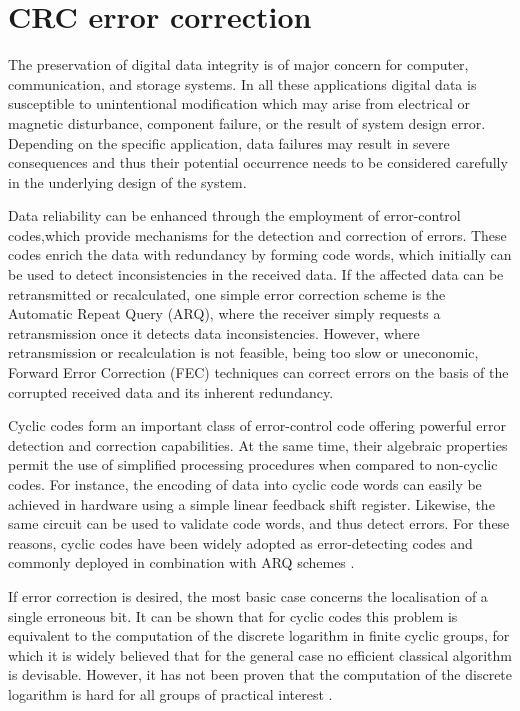 \documentclass[oneside, a4paper, 11pt]{memoir}
\begin{document}
\chapter{CRC error correction}
\label{sec:crc}

The preservation of digital data integrity is of major concern for computer, communication, and storage systems. In all these applications digital data is susceptible to unintentional modification which may arise from electrical or magnetic disturbance, component failure, or the result of system design error. Depending on the specific application, data failures may result in severe consequences and thus their potential occurrence needs to be considered carefully in the underlying design of the system.

Data reliability can be enhanced through the employment of error-control codes,which provide mechanisms for the detection and correction of errors. These codes enrich the data with redundancy by forming code words, which initially can be used to detect inconsistencies in the received data. If the affected data can be retransmitted or recalculated, one simple error correction scheme is the Automatic Repeat Query (ARQ), where the receiver simply requests a retransmission once it detects data inconsistencies. However, where retransmission or recalculation is not feasible, being too slow or uneconomic, Forward Error Correction (FEC) techniques can correct errors on the basis of the corrupted received data and its inherent redundancy.

Cyclic codes form an important class of error-control code offering powerful error detection and correction capabilities. At the same time, their algebraic properties permit the use of simplified processing procedures when compared to non-cyclic codes. For instance, the encoding of data into cyclic code words can easily be achieved in hardware using a simple linear feedback shift register. Likewise, the same circuit can be used to validate code words, and thus detect errors. For these reasons, cyclic codes have been widely adopted as error-detecting codes and commonly deployed in combination with ARQ schemes \citep{grymel2013error}. 

If error correction is desired, the most basic case concerns the localisation of a single erroneous bit. It can be shown that for cyclic codes this problem is equivalent to the computation of the discrete logarithm in finite cyclic groups, for which it is widely believed that for the general case no efficient classical algorithm is devisable. However, it has not been proven that the computation of the discrete logarithm is hard for all groups of practical interest \citep{grymel2013error}.
\end{document}
